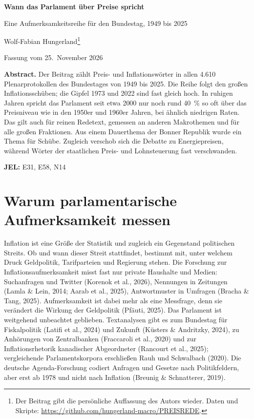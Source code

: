 \documentclass[11pt,a4paper]{article}
\begin{document}
\begin{flushleft}
{\sffamily\bfseries\LARGE Wann das Parlament über Preise spricht\par}
\vspace{0.4em}
{\sffamily\large Eine Aufmerksamkeitsreihe für den Bundestag, 1949 bis 2025\par}
\vspace{1em}
{\sffamily Wolf-Fabian Hungerland\footnote{Der Beitrag gibt die persönliche Auffassung des Autors wieder. Daten und Skripte: \url{https://github.com/hungerland-macro/PREISREDE}.}\par}
\vspace{0.3em}
{\sffamily\small Fassung vom 25.~November 2026\par}
\end{flushleft}
\vspace{0.8em}
\noindent\begin{minipage}{\linewidth}\small
\textsf{\textbf{Abstract.}} Der Beitrag zählt Preis- und Inflationswörter in allen 4.610 Plenarprotokollen des Bundestages von 1949 bis 2025. Die Reihe folgt den großen Inflationsschüben; die Gipfel 1973 und 2022 sind fast gleich hoch. In ruhigen Jahren spricht das Parlament seit etwa 2000 nur noch rund 40~\% so oft über das Preisniveau wie in den 1950er und 1960er Jahren, bei ähnlich niedrigen Raten. Das gilt auch für reinen Redetext, gemessen an anderen Makrothemen und für alle großen Fraktionen. Aus einem Dauerthema der Bonner Republik wurde ein Thema für Schübe. Zugleich verschob sich die Debatte zu Energiepreisen, während Wörter der staatlichen Preis- und Lohnsteuerung fast verschwanden.\par\vspace{0.4em}
\textsf{\textbf{JEL:}} E31, E58, N14
\end{minipage}
\vspace{0.6em}



\section{Warum parlamentarische Aufmerksamkeit messen}

Inflation ist eine Größe der Statistik und zugleich ein Gegenstand politischen Streits. Ob und wann dieser Streit stattfindet, bestimmt mit, unter welchem Druck Geldpolitik, Tarifparteien und Regierung stehen. Die Forschung zur Inflationsaufmerksamkeit misst fast nur private Haushalte und Medien: Suchanfragen und Twitter (Korenok et al., 2026), Nennungen in Zeitungen (Lamla \& Lein, 2014; Aarab et al., 2025), Antwortmuster in Umfragen (Bracha \& Tang, 2025). Aufmerksamkeit ist dabei mehr als eine Messfrage, denn sie verändert die Wirkung der Geldpolitik (Pfäuti, 2025). Das Parlament ist weitgehend unbeachtet geblieben. Textanalysen gibt es zum Bundestag für Fiskalpolitik (Latifi et al., 2024) und Zukunft (Küsters \& Andritzky, 2024), zu Anhörungen von Zentralbanken (Fraccaroli et al., 2020) und zur Inflationsrhetorik kanadischer Abgeordneter (Rancourt et al., 2025); vergleichende Parlamentskorpora erschließen Rauh und Schwalbach (2020). Die deutsche Agenda-Forschung codiert Anfragen und Gesetze nach Politikfeldern, aber erst ab 1978 und nicht nach Inflation (Breunig \& Schnatterer, 2019).
\end{document}
